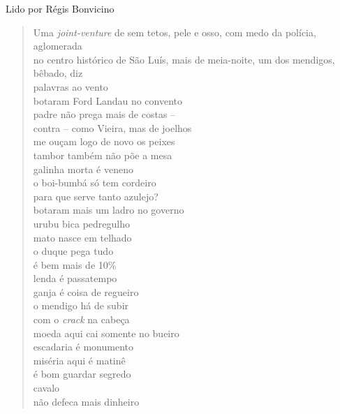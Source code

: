 Lido por Régis Bonvicino

\begin{verse}
Uma \emph{joint-venture} de sem tetos, pele e osso, com medo da polícia, \qb{}aglomerada\\
no centro histórico de São Luís, mais de meia-noite, um dos mendigos, \qb{}bêbado, diz\\[15pt]
palavras ao vento\\
botaram Ford Landau no convento\\
padre não prega mais de costas --\\
contra -- como Vieira, mas de joelhos\\[5pt]
me ouçam logo de novo os peixes\\
tambor também não põe a mesa\\
galinha morta é veneno\\
o boi-bumbá só tem cordeiro\\[5pt]
para que serve tanto azulejo?\\
botaram mais um ladro no governo\\
urubu bica pedregulho\\
mato nasce em telhado\\[5pt]
o duque pega tudo\\
é bem mais de 10\%\\
lenda é passatempo\\
ganja é coisa de regueiro\\[5pt]
o mendigo há de subir\\
com o \emph{crack} na cabeça\\
moeda aqui cai somente no bueiro\\
escadaria é monumento\\[5pt]
miséria aqui é matinê\\
é bom guardar segredo\\
cavalo\\
não defeca mais dinheiro
\end{verse}

\pagebreak

